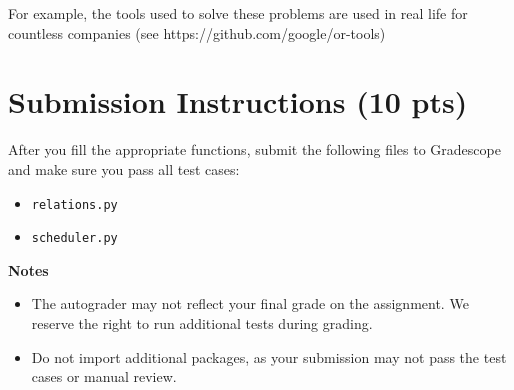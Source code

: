 \documentclass{article}
\begin{document}
        



    For example, the tools used to solve these problems are used in real life for countless companies (see https://github.com/google/or-tools)


\section*{Submission Instructions (10 pts)}
    After you fill the appropriate functions, submit the following files to Gradescope and make sure you pass all test cases:
    \begin{itemize}
        \item \lstinline{relations.py}
        \item \lstinline{scheduler.py}
    \end{itemize}

    \vspace{3mm}
    \textbf{Notes}

    \begin{itemize}
        \item The autograder may not reflect your final grade on the assignment. We reserve the right to run additional tests during grading.
        \item Do not import additional packages, as your submission may not pass the test cases or manual review.
    \end{itemize}

    
\end{document}
